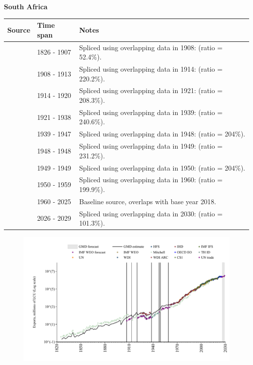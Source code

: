 \documentclass[12pt,a4paper,landscape]{article}
\begin{document}
\begin{adjustbox}{max totalsize={\paperwidth}{\paperheight},center}
\begin{minipage}[t][\textheight][t]{\textwidth}
\vspace*{0.5cm}
{}
\begin{center}
{\Large\bfseries South Africa}
\end{center}
\vspace{0.5cm}
\begin{table}[H]
\centering
\small
\begin{tabular}{|l|l|l|}
\hline
\textbf{Source} & \textbf{Time span} & \textbf{Notes} \\
\hline
\rowcolor{white}\cite{Mitchell}& 1826 - 1907 &Spliced using overlapping data in 1908: (ratio = 52.4\%).\\
\rowcolor{lightgray}\cite{UN_trade}& 1908 - 1913 &Spliced using overlapping data in 1914: (ratio = 220.2\%).\\
\rowcolor{white}\cite{Mitchell}& 1914 - 1920 &Spliced using overlapping data in 1921: (ratio = 208.3\%).\\
\rowcolor{lightgray}\cite{UN_trade}& 1921 - 1938 &Spliced using overlapping data in 1939: (ratio = 240.6\%).\\
\rowcolor{white}\cite{Mitchell}& 1939 - 1947 &Spliced using overlapping data in 1948: (ratio = 204\%).\\
\rowcolor{lightgray}\cite{UN_trade}& 1948 - 1948 &Spliced using overlapping data in 1949: (ratio = 231.2\%).\\
\rowcolor{white}\cite{Mitchell}& 1949 - 1949 &Spliced using overlapping data in 1950: (ratio = 204\%).\\
\rowcolor{lightgray}\cite{UN_trade}& 1950 - 1959 &Spliced using overlapping data in 1960: (ratio = 199.9\%).\\
\rowcolor{white}\cite{OECD_EO}& 1960 - 2025 &Baseline source, overlaps with base year 2018.\\
\rowcolor{lightgray}\cite{IMF_WEO_forecast}& 2026 - 2029 &Spliced using overlapping data in 2030: (ratio = 101.3\%).\\
\hline
\end{tabular}
\end{table}
\begin{figure}[H]
\centering
\includegraphics[width=\textwidth,height=0.6\textheight,keepaspectratio]{graphs/ZAF_exports.pdf}

\end{figure}
\end{minipage}
\end{adjustbox}
\end{document}
